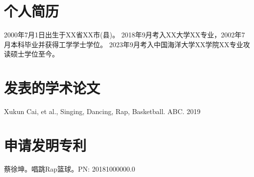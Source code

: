 \documentclass[pdf,oneside]{oucthesis}
\begin{document}
\begin{profile}
\section*{个人简历}
2000年7月1日出生于XX省XX市(县)。
2018年9月考入XX大学XX专业，2002年7月本科毕业并获得工学学士学位。
2023年9月考入中国海洋大学XX学院XX专业攻读硕士学位至今。

\section*{发表的学术论文}
\noindent[1] Xukun Cai, et al., Singing, Dancing, Rap, Basketball. ABC. 2019

\section*{申请发明专利}
\noindent[1]蔡徐坤。唱跳Rap篮球。PN: 20181000000.0
\end{profile}
\end{document}
